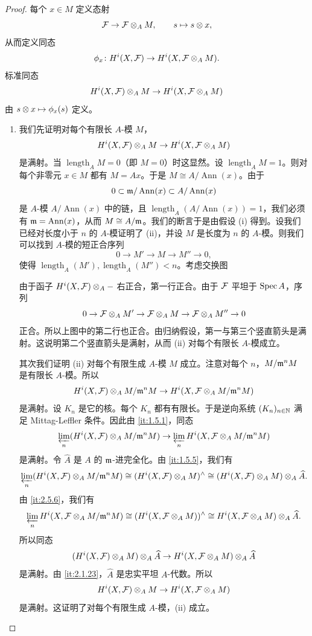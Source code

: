 \begin{proof}
每个 $x\in M$ 定义态射
\[
\mathcal{F}\to\mathcal{F}\otimes_A M,\qquad s\mapsto s\otimes x,
\]
从而定义同态
\[
\phi_x\colon H^i(X,\mathcal{F})\to H^i(X,\mathcal{F}\otimes_A M).
\]
标准同态
\[
H^i(X,\mathcal{F})\otimes_A M\to H^i(X,\mathcal{F}\otimes_A M)
\]
由 $s\otimes x\mapsto\phi_x(s)$ 定义。
\begin{enumerate}[label=(\roman*)]
\item[(i)$\Rightarrow$(ii)] 我们先证明对每个有限长 $A$-模 $M$，
\[
H^i(X,\mathcal{F})\otimes_A M\to H^i(X,\mathcal{F}\otimes_A M)
\]
是满射。当 $\operatorname{length}_AM=0$（即 $M=0$）时这显然。设 $\operatorname{length}_AM=1$。则对每个非零元 $x\in M$ 都有 $M=Ax$。于是 $M\cong A/\operatorname{Ann}(x)$。由于
\[
0\subset\mathfrak{m}/\operatorname{Ann}(x)\subset A/\operatorname{Ann}(x)
\]
是 $A$-模 $A/\operatorname{Ann}(x)$ 中的链，且 $\operatorname{length}_A(A/\operatorname{Ann}(x))=1$，我们必须有 $\mathfrak{m}=\operatorname{Ann}(x)$，从而 $M\cong A/\mathfrak{m}$。我们的断言于是由假设 (i) 得到。设我们已经对长度小于 $n$ 的 $A$-模证明了 (ii)，并设 $M$ 是长度为 $n$ 的 $A$-模。则我们可以找到 $A$-模的短正合序列
\[
0\to M'\to M\to M''\to 0,
\]
使得 $\operatorname{length}_A(M'),\operatorname{length}_A(M'')<n$。考虑交换图

\begin{center}
\end{center}

由于函子 $H^i(X,\mathcal{F})\otimes_A-$ 右正合，第一行正合。由于 $\mathcal{F}$ 平坦于 $\operatorname{Spec} A$，序列
\[
0\to\mathcal{F}\otimes_A M'\to\mathcal{F}\otimes_A M\to\mathcal{F}\otimes_A M''\to 0
\]
正合。所以上图中的第二行也正合。由归纳假设，第一与第三个竖直箭头是满射。这说明第二个竖直箭头是满射，从而 (ii) 对每个有限长 $A$-模成立。

其次我们证明 (ii) 对每个有限生成 $A$-模 $M$ 成立。注意对每个 $n$，$M/\mathfrak{m}^nM$ 是有限长 $A$-模。所以
\[
H^i(X,\mathcal{F})\otimes_A M/\mathfrak{m}^nM\to H^i(X,\mathcal{F}\otimes_A M/\mathfrak{m}^nM)
\]
是满射。设 $K_n$ 是它的核。每个 $K_n$ 都有有限长。于是逆向系统 $(K_n)_{n\in\mathbb{N}}$ 满足 Mittag-Leffler 条件。因此由 \ref{it:1.5.1}，同态
\[
\varprojlim_n(H^i(X,\mathcal{F})\otimes_A M/\mathfrak{m}^nM)\to\varprojlim_nH^i(X,\mathcal{F}\otimes_A M/\mathfrak{m}^nM)
\]
是满射。令 $\widehat A$ 是 $A$ 的 $\mathfrak{m}$-进完全化。由 \ref{it:1.5.5}，我们有
\[
\varprojlim_n(H^i(X,\mathcal{F})\otimes_A M/\mathfrak{m}^nM)\cong(H^i(X,\mathcal{F})\otimes_A M)^\wedge\cong(H^i(X,\mathcal{F})\otimes_A M)\otimes_A\widehat A.
\]
由 \ref{it:2.5.6}，我们有
\[
\varprojlim_nH^i(X,\mathcal{F}\otimes_A M/\mathfrak{m}^nM)\cong(H^i(X,\mathcal{F}\otimes_A M))^\wedge\cong H^i(X,\mathcal{F}\otimes_A M)\otimes_A\widehat A.
\]
所以同态
\[
(H^i(X,\mathcal{F})\otimes_A M)\otimes_A\widehat A\to H^i(X,\mathcal{F}\otimes_A M)\otimes_A\widehat A
\]
是满射。由 \ref{it:2.1.23}，$\widehat A$ 是忠实平坦 $A$-代数。所以
\[
H^i(X,\mathcal{F})\otimes_A M\to H^i(X,\mathcal{F}\otimes_A M)
\]
是满射。这证明了对每个有限生成 $A$-模，(ii) 成立。


\end{enumerate}
\end{proof}
